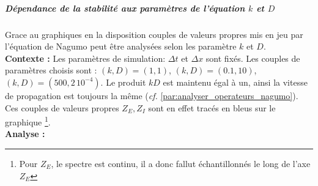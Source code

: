             \subparagraph{Dépendance de la stabilité aux paramètres de l'équation $k$ et $D$}
                Grace au graphiques en  la disposition couples de valeurs 
                propres mis en jeu par l'équation de Nagumo peut être analysées selon les paramètre $k$ et $D$.\\
                \textbf{Contexte : }
                Les paramètres de simulation: $\Delta t$ et $\Delta x$ sont fixés.
                Les couples de paramètres choisis sont : $(k,D)=(1,1)$, $(k,D)=(0.1,10)$, $(k,D)=(500,2\, 10^{-4})$. 
                Le produit $kD$ est maintenu égal à un, ainsi la vitesse de propagation est toujours la même (\emph{cf.} \ref{par:analyser_operateurs_nagumo}).
                Ces couples de valeurs propres $Z_E,Z_I$ sont en effet tracés en bleus sur le graphique
                \footnote{Pour $Z_E$, le spectre est continu, il a donc fallut échantillonnés le long de l'axe $Z_E$}.\\
                \textbf{Analyse : }
